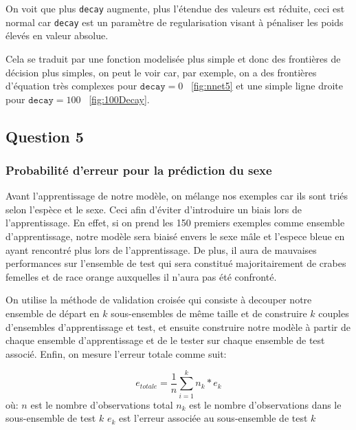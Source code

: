 \documentclass{article}
\begin{document}
\begin{multicols}{2}
On voit que plus \texttt{decay} augmente, plus l'étendue des valeurs est
réduite, ceci est normal car \texttt{decay} est un paramètre de regularisation
visant à pénaliser les poids élevés en valeur absolue.

Cela se traduit par une fonction modelisée plus simple et donc des frontières
de décision plus simples, on peut le voir car, par exemple, on a des frontières
d'équation très complexes pour $\texttt{decay} = 0$ ~\ref{fig:nnet5} et une
simple ligne droite pour $\texttt{decay} = 100$ ~\ref{fig:100Decay}.

\subsection{Question 5}\label{subsec:ex25}

\subsubsection{Probabilité d'erreur pour la prédiction du sexe}\label{subsubsec:ex251}

Avant l'apprentissage de notre modèle, on mélange nos exemples car ils sont
triés selon l'espèce et le sexe. Ceci afin d'éviter d'introduire un biais lors
de l'apprentissage. En effet, si on prend les 150 premiers exemples comme
ensemble d'apprentissage, notre modèle sera biaisé envers le sexe mâle et
l'espece bleue en ayant rencontré plus lors de l'apprentissage. De plus, il aura
de mauvaises performances sur l'ensemble de test qui sera constitué
majoritairement de crabes femelles et de race orange auxquelles il n'aura pas
été confronté.

On utilise la méthode de validation croisée qui consiste à decouper notre
ensemble de départ en $k$ sous-ensembles de même taille et de construire $k$
couples d'ensembles d'apprentissage et test, et ensuite construire notre modèle
à partir de chaque ensemble d'apprentissage et de le tester sur chaque ensemble
de test associé. Enfin, on mesure l'erreur totale comme suit:

\begin{equation}
    e_{totale} = \frac{1}{n} \sum_{i = 1}^{k} n_k * e_k
\end{equation}
où: $n$ est le nombre d'observations total \newline
$n_k$ est le nombre d'observations dans le sous-ensemble de test $k$ \newline
$e_k$ est l'erreur associée au sous-ensemble de test $k$


\end{multicols}
\end{document}

